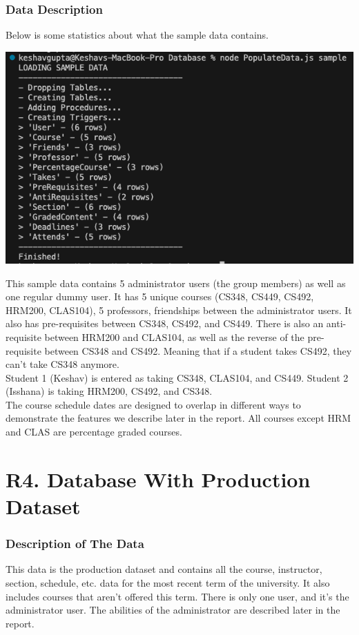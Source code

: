 \documentclass[12pt, a4paper]{article}
\begin{document}
\subsubsection*{Data Description}
Below is some statistics about what the sample data contains.
\begin{center}
    \includegraphics[width=\textwidth]{sampledata}
\end{center}

This sample data contains 5 administrator users (the group members) as well as one regular dummy user. It has 5 unique courses (CS348, CS449, CS492, HRM200, CLAS104), 5 professors, friendships between the administrator users. It also has pre-requisites between CS348, CS492, and CS449. There is also an anti-requisite between HRM200 and CLAS104, as well as the reverse of the pre-requisite between CS348 and CS492. Meaning that if a student takes CS492, they can't take CS348 anymore.\\
Student 1 (Keshav) is entered as taking CS348, CLAS104, and CS449. Student 2 (Isshana) is taking HRM200, CS492, and CS348.\\

The course schedule dates are designed to overlap in different ways to demonstrate the features we describe later in the report. All courses except HRM and CLAS are percentage graded courses.
\section*{R4. Database With Production Dataset}
\label{sec:R4}
\subsubsection*{Description of The Data}
This data is the production dataset and contains all the course, instructor, section, schedule, etc. data for the most recent term of the university. It also includes courses that aren't offered this term. There is only one user, and it's the administrator user. The abilities of the administrator are described later in the report.\\
\end{document}
